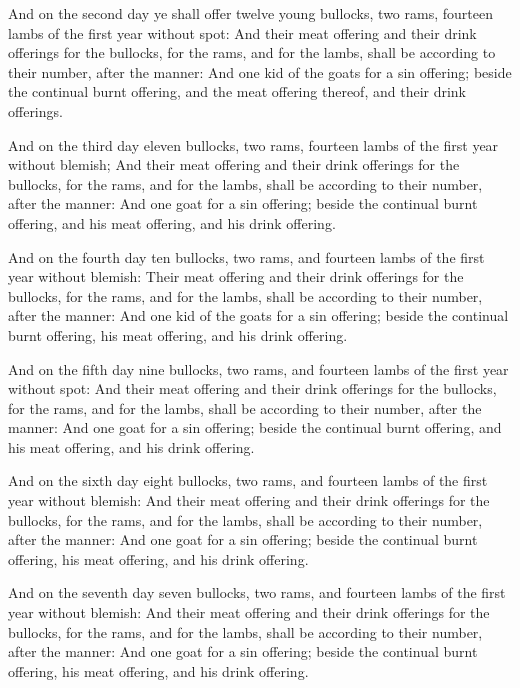 \verse And on the second day ye shall offer twelve young bullocks, two
rams, fourteen lambs of the first year without spot: \verse And their
meat offering and their drink offerings for the bullocks, for the
rams, and for the lambs, shall be according to their number, after the
manner: \verse And one kid of the goats for a sin offering; beside the
continual burnt offering, and the meat offering thereof, and their
drink offerings.

\verse And on the third day eleven bullocks, two rams, fourteen lambs
of the first year without blemish; \verse And their meat offering and
their drink offerings for the bullocks, for the rams, and for the
lambs, shall be according to their number, after the manner: \verse And
one goat for a sin offering; beside the continual burnt offering, and
his meat offering, and his drink offering.

\verse And on the fourth day ten bullocks, two rams, and fourteen lambs
of the first year without blemish: \verse Their meat offering and their
drink offerings for the bullocks, for the rams, and for the lambs,
shall be according to their number, after the manner: \verse And one
kid of the goats for a sin offering; beside the continual burnt
offering, his meat offering, and his drink offering.

\verse And on the fifth day nine bullocks, two rams, and fourteen lambs
of the first year without spot: \verse And their meat offering and
their drink offerings for the bullocks, for the rams, and for the
lambs, shall be according to their number, after the manner: \verse And
one goat for a sin offering; beside the continual burnt offering, and
his meat offering, and his drink offering.

\verse And on the sixth day eight bullocks, two rams, and fourteen
lambs of the first year without blemish: \verse And their meat offering
and their drink offerings for the bullocks, for the rams, and for the
lambs, shall be according to their number, after the manner: \verse And
one goat for a sin offering; beside the continual burnt offering, his
meat offering, and his drink offering.

\verse And on the seventh day seven bullocks, two rams, and fourteen
lambs of the first year without blemish: \verse And their meat offering
and their drink offerings for the bullocks, for the rams, and for the
lambs, shall be according to their number, after the manner: \verse And
one goat for a sin offering; beside the continual burnt offering, his
meat offering, and his drink offering.

